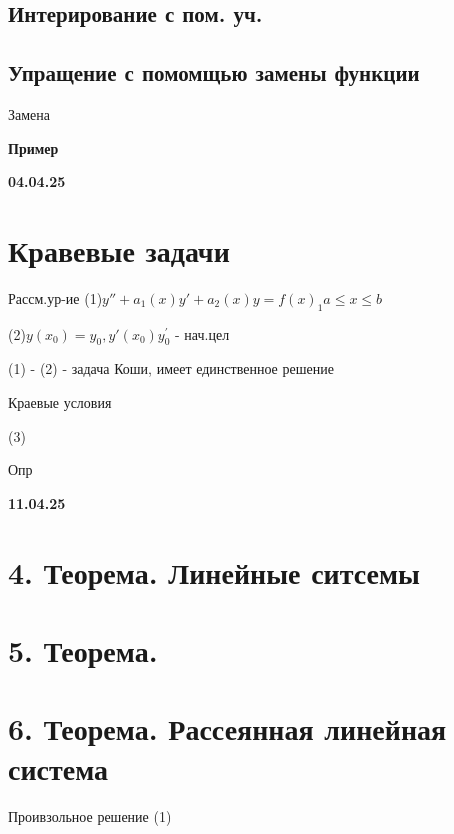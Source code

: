 \documentclass{article}
\begin{document}
\subsection{Интерирование с пом. уч.}

\subsection{Упращение с помомщью замены функции}

Замена




\textbf{Пример}






\textbf{04.04.25}

\section{Кравевые задачи}

Рассм.ур-ие
(1)$y''+a_1(x)y'+a_2(x)y = f(x)_1a\leq x \leq b$

(2)$y(x_0)=y_0, y'(x_0)y_{0}^{'}$ - нач.цел

(1) - (2) - задача Коши, имеет единственное решение

Краевые условия 

(3)


Опр



\vspace{1cm}

\textbf{11.04.25}



\section{4. Теорема. Линейные ситсемы}













\section{5. Теорема. }












































\section{6. Теорема. Рассеянная линейная система}


Проивзольное решение (1)
\end{document}
